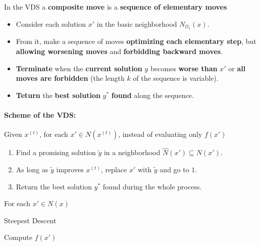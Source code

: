 In the VDS a \textbf{composite move} is a \textbf{sequence of elementary moves}
\begin{itemize}
	\item Consider each solution $x'$ in the basic neighborhood $N_{\mathcal{O}_1} (x)$.\\
	
	\item From it, make a sequence of moves \textbf{optimizing each elementary step}, but \textbf{allowing worsening moves} and \textbf{forbidding backward moves}.\\
	
	\item \textbf{Terminate} when the \textbf{current solution} $y$ becomes \textbf{worse than} $x'$ or \textbf{all moves are forbidden} (the length $k$ of the sequence is variable).\\
	
	\item \textbf{Teturn} the \textbf{best solution} $y^\ast$ \textbf{found} along the sequence.\\
\end{itemize}

\paragraph{Scheme of the VDS:} Given $x^{(t)}$, for each $x' \in N (x^{(t)})$, instead of evaluating only $f (x')$
\begin{enumerate}
	\item Find a promising solution $\tilde{y}$ in a neighborhood $\hat{N} (x') \subseteq N (x')$.\\
	
	\item As long as $\tilde{y}$ improves $x^{(t)}$, replace $x'$ with $\tilde{y}$ and go to $1$.\\
	
	\item Return the best solution $y^\ast$ found during the whole process.\\
\end{enumerate}

\newpage

\begin{center}
	For each $x' \in N (x)$
\end{center}

\begin{algorithm}
	\caption{Steepest Descent}
	\begin{algorithmic}
		\STATE Compute $f(x')$
	\end{algorithmic}
\end{algorithm}

